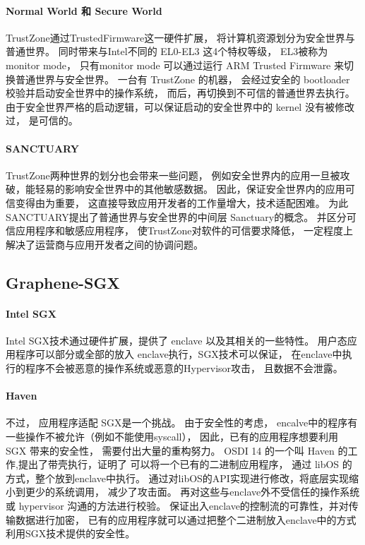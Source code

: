 \paragraph{Normal World 和 Secure World}TrustZone\cite{trustZone-p1}通过TrustedFirmware这一硬件扩展，
将计算机资源划分为安全世界与普通世界。
同时带来与Intel不同的 EL0-EL3 这4个特权等级，
EL3被称为 monitor mode\cite{trustZone-p3}，
只有monitor mode 可以通过运行 ARM Trusted Firmware 来切换普通世界与安全世界。
一台有 TrustZone 的机器，
会经过安全的 bootloader 校验并启动安全世界中的操作系统\cite{trustZone-p2}，
而后，再切换到不可信的普通世界去执行。
由于安全世界严格的启动逻辑，可以保证启动的安全世界中的 kernel 没有被修改过，
是可信的。
\paragraph{SANCTUARY}TrustZone两种世界的划分也会带来一些问题，
例如安全世界内的应用一旦被攻破，能轻易的影响安全世界中的其他敏感数据\cite{sanctuary-p2}。
因此，保证安全世界内的应用可信变得由为重要，
这直接导致应用开发者的工作量增大，技术适配困难。
为此SANCTUARY\cite{sanctuary-p1}提出了普通世界与安全世界的中间层 Sanctuary的概念。
并区分可信应用程序和敏感应用程序，
使TrustZone对软件的可信要求降低，
一定程度上解决了运营商与应用开发者之间的协调问题。

\subsection{Graphene-SGX}
\paragraph{Intel SGX}Intel SGX技术通过硬件扩展，提供了 enclave 以及其相关的一些特性。
用户态应用程序可以部分或全部的放入 enclave执行，SGX技术可以保证，
在enclave中执行的程序不会被恶意的操作系统或恶意的Hypervisor攻击，
且数据不会泄露。
\paragraph{Haven}不过，
应用程序适配 SGX是一个挑战。
由于安全性的考虑，
encalve中的程序有一些操作不被允许（例如不能使用syscall），
因此，已有的应用程序想要利用 SGX 带来的安全性，
需要付出大量的重构努力。
OSDI 14 的一个叫 Haven 的工作,提出了带壳执行，证明了
可以将一个已有的二进制应用程序，
通过 libOS 的方式，整个放到enclave中执行。
通过对libOS的API实现进行修改，将底层实现缩小到更少的系统调用，
减少了攻击面。
再对这些与enclave外不受信任的操作系统或 hypervisor 沟通的方法进行校验。
保证出入enclave的控制流的可靠性，并对传输数据进行加密，
已有的应用程序就可以通过把整个二进制放入enclave中的方式利用SGX技术提供的安全性。
